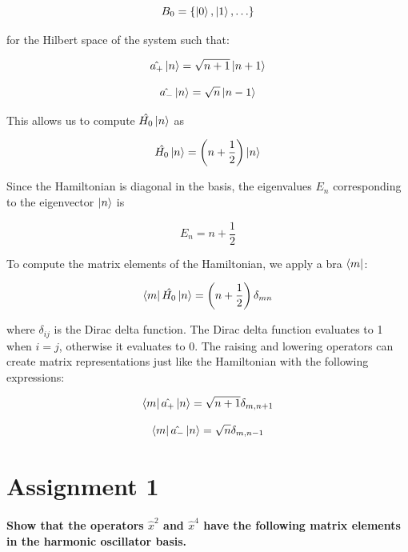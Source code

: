 \documentclass[12pt]{article}
\begin{document}
\begin{equation}
B_0 = \{ \ket{0}, \ket{1}, \ldots \}
\end{equation}

for the Hilbert space of the system such that:

\begin{equation}
\hat{a_+} \ket{n} = \sqrt{n+1} \ket{n+1}
\end{equation}

\begin{equation}
\hat{a_-} \ket{n} = \sqrt{n} \ket{n-1}
\end{equation}

This allows us to compute $\hat{H_0} \ket{n}$ as

\begin{equation}
\hat{H_0} \ket{n} = \left(n + \frac{1}{2}\right) \ket{n}
\end{equation}

Since the Hamiltonian is diagonal in the basis, the eigenvalues $E_n$ corresponding to the eigenvector $\ket{n}$ is

\begin{equation}
E_n = n + \frac{1}{2}
\end{equation}

To compute the matrix elements of the Hamiltonian, we apply a bra $\bra{m}$:

\begin{equation}
\bra{m} \hat{H_0} \ket{n} = \left( n + \frac{1}{2} \right) \delta_{mn}
\end{equation}

where $\delta_{ij}$ is the Dirac delta function. The Dirac delta function evaluates to 1 when $i = j$, otherwise it evaluates to 0. The raising and lowering operators can create matrix representations just like the Hamiltonian with the following expressions:

\begin{equation}
\bra{m} \hat{a_+} \ket{n} = \sqrt{n+1} \delta_{m, n+1}
\end{equation}

\begin{equation}
\bra{m} \hat{a_-} \ket{n} = \sqrt{n} \delta_{m, n-1}
\end{equation}

\section{Assignment 1}
\paragraph{Show that the operators $\hat{x}^2$ and $\hat{x}^4$ have the following matrix elements in the harmonic oscillator basis.} 
\end{document}
